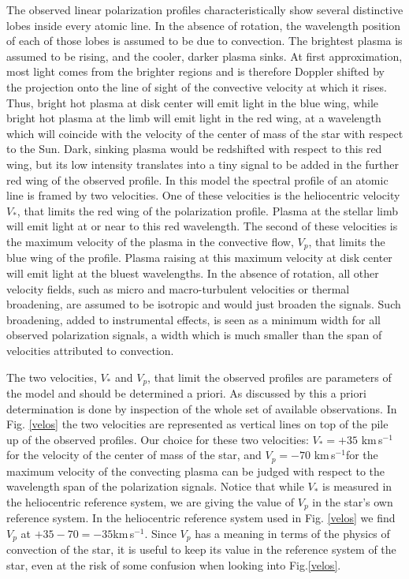 \documentclass{/Users/art2/TeX/aanda/aa}
\def\kms {km\,s$^{-1}$}
\begin{document}
The observed linear polarization profiles characteristically show several distinctive lobes inside every atomic line. In the absence of rotation, the wavelength position of each of those lobes is assumed to be due to convection. The brightest plasma is assumed to be rising, and the cooler, darker plasma sinks. At first approximation, most light comes from the brighter regions and is therefore Doppler shifted by the projection onto the line of sight of the convective velocity at which it rises. Thus, bright hot plasma at disk center will emit light in the blue wing, while bright hot plasma at the limb will emit light in the red wing, at a wavelength which will coincide with the velocity of the center of mass of the star with respect to the Sun. Dark, sinking plasma would be redshifted with respect to this red wing, but its low intensity translates into a  tiny signal  to be added in the further red wing of the observed profile. In this model the spectral profile of an atomic line is framed by two velocities. One of these velocities is the heliocentric velocity $V_*$, that limits the red wing of the polarization profile. 
Plasma at the stellar limb will emit light at or near to this red wavelength. The second of these velocities is the maximum velocity of the plasma in the convective flow, $V_p$, that limits the blue wing of the profile. Plasma raising at this maximum velocity  at disk center will emit light at the bluest wavelengths.  In the absence of rotation, all other velocity fields, such as micro and macro-turbulent velocities or thermal broadening,  are assumed to be isotropic and would just broaden the signals. Such broadening, added to instrumental effects, is seen as a minimum width for all observed polarization signals, a width which is much smaller than the span of velocities attributed to convection.

The two velocities, $V_*$ and $V_p$, that limit the observed profiles are parameters of the model and should be determined a priori. As discussed by \cite{LA22} this a priori determination is done by inspection of the whole set of available observations. In Fig. \ref{velos} the two velocities are represented as vertical lines on top of the pile up of the observed profiles. Our choice for these two velocities: $V_*=+35$ \kms for the velocity of the center of mass of the star, and $V_p=-70$ \kms for the maximum velocity of the convecting plasma can be judged with respect to the wavelength span of the polarization signals. Notice that while $V_*$ is measured in the heliocentric reference system, we are giving the value of $V_p$ in the star's own reference system. In the heliocentric reference system used in Fig. \ref{velos} we find $V_p$ at $+35-70=-35 $\kms. Since $V_p$ has a meaning in terms of the physics of convection of the star, it is useful to keep its value in the reference system of the star, even at the risk of some confusion when looking into Fig.\ref{velos}.
\end{document}
